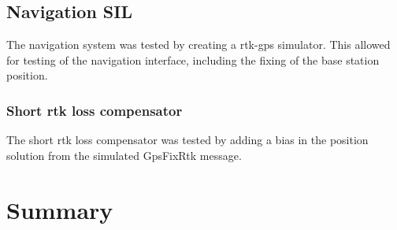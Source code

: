 \subsection{Navigation SIL}
The navigation system was tested by creating a \gls{rtk-gps} simulator. This allowed for testing of the navigation interface, including the fixing of the base station position.

\subsubsection{Short rtk loss compensator}
The short rtk loss compensator was tested by adding a bias in the position solution from the simulated GpsFixRtk message. 
\section{Summary}
